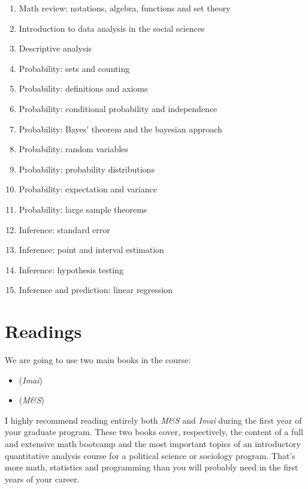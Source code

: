 \documentclass[a4paper,11pt]{article}
\begin{document}
  \begin{enumerate}
        \item Math review: notations, algebra, functions and set theory
        \item Introduction to data analysis in the social sciences
        \item Descriptive analysis
        \item Probability: sets and counting
        \item Probability: definitions and axioms
        \item Probability: conditional probability and independence
        \item Probability: Bayes' theorem and the bayesian approach
        \item Probability: random variables
        \item Probability: probability distributions
        \item Probability: expectation and variance
        \item Probability: large sample theorems
		\item Inference: standard error
        \item Inference: point and interval estimation
        \item Inference: hypothesis testing
        \item Inference and prediction: linear regression
        
    \end{enumerate}

\section{Readings}

We are going to use two main books in the course:

\begin{itemize}
  \item (\emph{Imai}) 
  \item (\emph{M\&S}) 
\end{itemize}

I highly recommend reading entirely both \emph{M\&S} and \emph{Imai} during the first year of your graduate program. These two books cover, respectively, the content of a full and extensive math bootcamp and the most important topics of an introductory quantitative analysis course for a political science or sociology program. That's more math, statistics and programming than you will probably need in the first years of your career.
\end{document}
